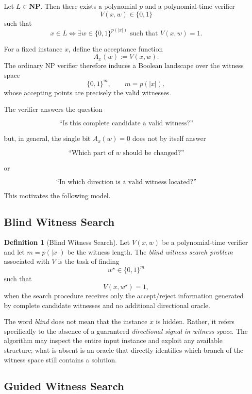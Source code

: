 \documentclass[11pt]{article}
\theoremstyle{plain}
\theoremstyle{definition}
\newtheorem{definition}[theorem]{Definition}
\begin{document}
Let \(L\in \mathbf{NP}\).  Then there exists a polynomial \(p\) and a
polynomial-time verifier
\[
    V(x,w)\in\{0,1\}
\]
such that
\[
    x\in L
    \iff
    \exists w\in\{0,1\}^{p(|x|)}
    \text{ such that } V(x,w)=1.
\]

For a fixed instance \(x\), define the acceptance function
\[
    A_x(w):=V(x,w).
\]
The ordinary NP verifier therefore induces a Boolean landscape over the
witness space
\[
    \{0,1\}^{m},
    \qquad
    m=p(|x|),
\]
whose accepting points are precisely the valid witnesses.

The verifier answers the question

\[
    \text{``Is this complete candidate a valid witness?''}
\]

but, in general, the single bit \(A_x(w)=0\) does not by itself answer

\[
    \text{``Which part of }w\text{ should be changed?''}
\]

or

\[
    \text{``In which direction is a valid witness located?''}
\]

This motivates the following model.

\subsection{Blind Witness Search}

\begin{definition}[Blind Witness Search]
\label{def:blind-witness-search}
Let \(V(x,w)\) be a polynomial-time verifier and let
\(m=p(|x|)\) be the witness length.  The \emph{blind witness search problem}
associated with \(V\) is the task of finding
\[
    w^\star\in\{0,1\}^{m}
\]
such that
\[
    V(x,w^\star)=1,
\]
when the search procedure receives only the accept/reject information
generated by complete candidate witnesses and no additional directional
oracle.
\end{definition}

The word \emph{blind} does not mean that the instance \(x\) is hidden.
Rather, it refers specifically to the absence of a guaranteed
\emph{directional signal in witness space}.  The algorithm may inspect the
entire input instance and exploit any available structure; what is absent is
an oracle that directly identifies which branch of the witness space still
contains a solution.

\subsection{Guided Witness Search}
\end{document}
